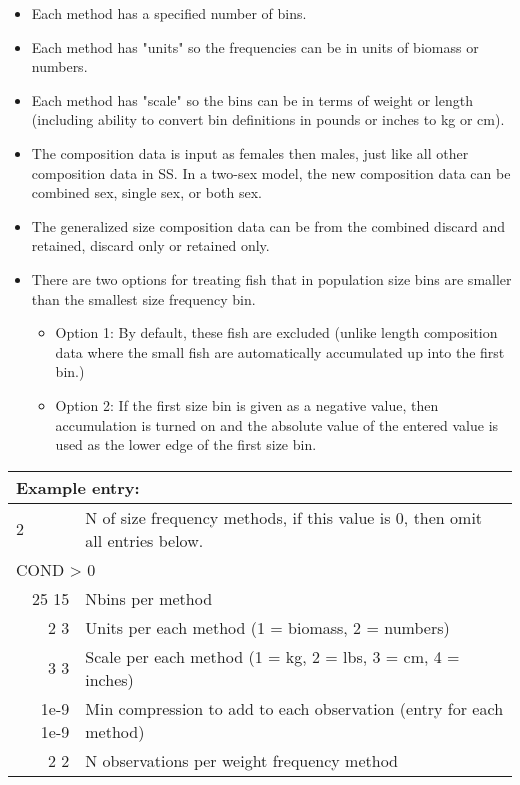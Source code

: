 \begin{itemize}
	\item Each method has a specified number of bins.
	\item Each method has "units" so the frequencies can be in units of biomass or numbers.
	\item Each method has "scale" so the bins can be in terms of weight or length (including ability to convert bin definitions in pounds or inches to kg or cm). 
	\item The composition data is input as females then males, just like all other composition data in SS. In a two-sex model, the new composition data can be combined sex, single sex, or both sex.
	\item The generalized size composition data can be from the combined discard and retained, discard only or retained only.
	\item There are two options for treating fish that in population size bins are smaller than the smallest size frequency bin.
	\begin{itemize}
		\item Option 1: By default, these fish are excluded (unlike length composition data where the small fish are automatically accumulated up into the first bin.)
		\item Option 2: If the first size bin is given as a negative value, then accumulation is turned on and the absolute value of the entered value is used as the lower edge of the first size bin.
	\end{itemize}
\end{itemize}

\begin{center}
	\begin{tabular}{p{1.4cm} p{0.5cm} p{13 cm}}
		\multicolumn{3}{l}{Example entry:}\\
		\hline
		2 &  & N of size frequency methods, if this value is 0, then omit all entries below. \Tstrut\Bstrut\\
		\hline
		\multicolumn{3}{l}{COND > 0 }  \Tstrut\\
		\multicolumn{2}{r}{25 15} & Nbins per method\\
		\multicolumn{2}{r}{2 3} & Units per each method (1 = biomass, 2 = numbers)\\
		\multicolumn{2}{r}{3 3} & Scale per each method (1 = kg, 2 = lbs, 3 = cm, 4 = inches)\\
		\multicolumn{2}{r}{1e-9 1e-9} & Min compression to add to each observation (entry for each method)\\
		\multicolumn{2}{r}{2 2} & N observations per weight frequency method \Bstrut\\
		\hline
	\end{tabular}
\end{center}

